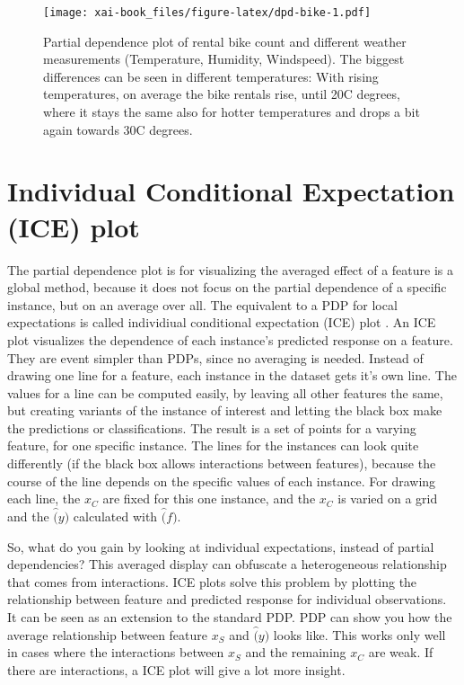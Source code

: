 \documentclass[12pt,]{krantz}
\theoremstyle{definition}
\theoremstyle{definition}
\theoremstyle{definition}
\theoremstyle{remark}
\begin{document}
\begin{figure}
\centering
\texttt{[image: xai-book\_files/figure-latex/dpd-bike-1.pdf]}
\caption{\label{fig:dpd-bike}Partial dependence plot of rental bike count
and different weather measurements (Temperature, Humidity, Windspeed).
The biggest differences can be seen in different temperatures: With
rising temperatures, on average the bike rentals rise, until 20C
degrees, where it stays the same also for hotter temperatures and drops
a bit again towards 30C degrees.}
\end{figure}

\section{Individual Conditional Expectation (ICE)
plot}\label{individual-conditional-expectation-ice-plot}

The partial dependence plot is for visualizing the averaged effect of a
feature is a global method, because it does not focus on the partial
dependence of a specific instance, but on an average over all. The
equivalent to a PDP for local expectations is called individiual
conditional expectation (ICE) plot \citep{goldstein2015peeking}. An ICE
plot visualizes the dependence of each instance's predicted response on
a feature. They are event simpler than PDPs, since no averaging is
needed. Instead of drawing one line for a feature, each instance in the
dataset gets it's own line. The values for a line can be computed
easily, by leaving all other features the same, but creating variants of
the instance of interest and letting the black box make the predictions
or classifications. The result is a set of points for a varying feature,
for one specific instance. The lines for the instances can look quite
differently (if the black box allows interactions between features),
because the course of the line depends on the specific values of each
instance. For drawing each line, the \(x_C\) are fixed for this one
instance, and the \(x_C\) is varied on a grid and the \(\hat(y)\)
calculated with \(\hat(f)\).

So, what do you gain by looking at individual expectations, instead of
partial dependencies? This averaged display can obfuscate a
heterogeneous relationship that comes from interactions. ICE plots
\citep{goldstein2015peeking} solve this problem by plotting the
relationship between feature and predicted response for individual
observations. It can be seen as an extension to the standard PDP. PDP
can show you how the average relationship between feature \(x_S\) and
\(\hat(y)\) looks like. This works only well in cases where the
interactions between \(x_S\) and the remaining \(x_C\) are weak. If
there are interactions, a ICE plot will give a lot more insight.
\end{document}
